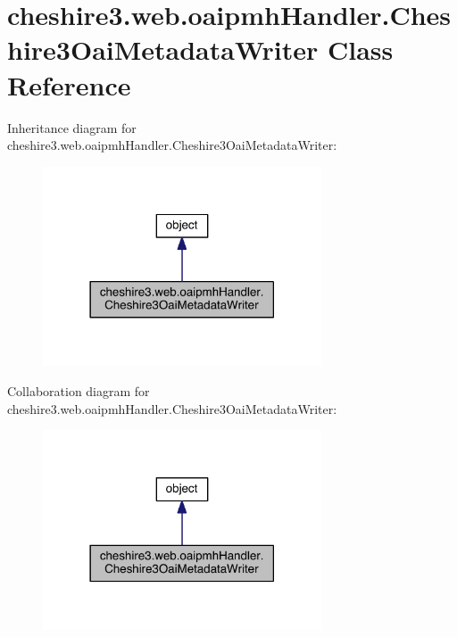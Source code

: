 \hypertarget{classcheshire3_1_1web_1_1oaipmh_handler_1_1_cheshire3_oai_metadata_writer}{\section{cheshire3.\-web.\-oaipmh\-Handler.\-Cheshire3\-Oai\-Metadata\-Writer Class Reference}
\label{classcheshire3_1_1web_1_1oaipmh_handler_1_1_cheshire3_oai_metadata_writer}
}


Inheritance diagram for cheshire3.\-web.\-oaipmh\-Handler.\-Cheshire3\-Oai\-Metadata\-Writer\-:
\nopagebreak
\begin{figure}[H]
\begin{center}
\leavevmode
\includegraphics[width=234pt]{classcheshire3_1_1web_1_1oaipmh_handler_1_1_cheshire3_oai_metadata_writer__inherit__graph}
\end{center}
\end{figure}


Collaboration diagram for cheshire3.\-web.\-oaipmh\-Handler.\-Cheshire3\-Oai\-Metadata\-Writer\-:
\nopagebreak
\begin{figure}[H]
\begin{center}
\leavevmode
\includegraphics[width=234pt]{classcheshire3_1_1web_1_1oaipmh_handler_1_1_cheshire3_oai_metadata_writer__coll__graph}
\end{center}
\end{figure}
